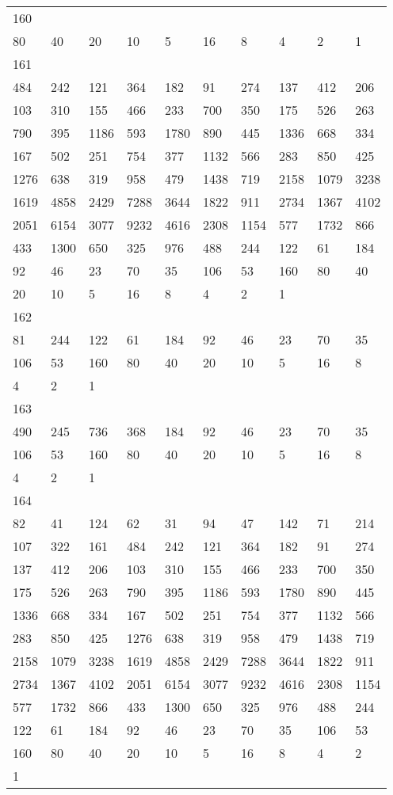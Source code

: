 \begin{longtable}{*{10}{l}}
160&&&&&&&&&\\
80& 40& 20& 10& 5& 16& 8& 4& 2& 1\\

161&&&&&&&&&\\
484& 242& 121& 364& 182& 91& 274& 137& 412& 206\\
103& 310& 155& 466& 233& 700& 350& 175& 526& 263\\
790& 395& 1186& 593& 1780& 890& 445& 1336& 668& 334\\
167& 502& 251& 754& 377& 1132& 566& 283& 850& 425\\
1276& 638& 319& 958& 479& 1438& 719& 2158& 1079& 3238\\
1619& 4858& 2429& 7288& 3644& 1822& 911& 2734& 1367& 4102\\
2051& 6154& 3077& 9232& 4616& 2308& 1154& 577& 1732& 866\\
433& 1300& 650& 325& 976& 488& 244& 122& 61& 184\\
92& 46& 23& 70& 35& 106& 53& 160& 80& 40\\
20& 10& 5& 16& 8& 4& 2& 1& \\

162&&&&&&&&&\\
81& 244& 122& 61& 184& 92& 46& 23& 70& 35\\
106& 53& 160& 80& 40& 20& 10& 5& 16& 8\\
4& 2& 1& \\

163&&&&&&&&&\\
490& 245& 736& 368& 184& 92& 46& 23& 70& 35\\
106& 53& 160& 80& 40& 20& 10& 5& 16& 8\\
4& 2& 1& \\

164&&&&&&&&&\\
82& 41& 124& 62& 31& 94& 47& 142& 71& 214\\
107& 322& 161& 484& 242& 121& 364& 182& 91& 274\\
137& 412& 206& 103& 310& 155& 466& 233& 700& 350\\
175& 526& 263& 790& 395& 1186& 593& 1780& 890& 445\\
1336& 668& 334& 167& 502& 251& 754& 377& 1132& 566\\
283& 850& 425& 1276& 638& 319& 958& 479& 1438& 719\\
2158& 1079& 3238& 1619& 4858& 2429& 7288& 3644& 1822& 911\\
2734& 1367& 4102& 2051& 6154& 3077& 9232& 4616& 2308& 1154\\
577& 1732& 866& 433& 1300& 650& 325& 976& 488& 244\\
122& 61& 184& 92& 46& 23& 70& 35& 106& 53\\
160& 80& 40& 20& 10& 5& 16& 8& 4& 2\\
1& \\


\end{longtable}
